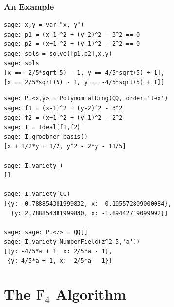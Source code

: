 \documentclass[9pt]{beamer}
\begin{document}
\begin{frame}
\frametitle{An Example}

 
\framebreak

\begin{lstlisting}
sage: x,y = var("x, y")
sage: p1 = (x-1)^2 + (y-2)^2 - 3^2 == 0
sage: p2 = (x+1)^2 + (y-1)^2 - 2^2 == 0
sage: sols = solve([p1,p2],x,y)
sage: sols
[x == -2/5*sqrt(5) - 1, y == 4/5*sqrt(5) + 1], 
[x == 2/5*sqrt(5) - 1, y == -4/5*sqrt(5) + 1]] 
\end{lstlisting}

\framebreak

\begin{lstlisting}
sage: P.<x,y> = PolynomialRing(QQ, order='lex')
sage: f1 = (x-1)^2 + (y-2)^2 - 3^2
sage: f2 = (x+1)^2 + (y-1)^2 - 2^2 
sage: I = Ideal(f1,f2)
sage: I.groebner_basis()
[x + 1/2*y + 1/2, y^2 - 2*y - 11/5]

sage: I.variety()
[]

sage: I.variety(CC)
[{y: -0.788854381999832, x: -0.105572809000084},
  {y: 2.788854381999830, x: -1.89442719099992}]

sage: sage: P.<z> = QQ[]
sage: I.variety(NumberField(z^2-5,'a'))
[{y: -4/5*a + 1, x: 2/5*a - 1}, 
 {y: 4/5*a + 1, x: -2/5*a - 1}]
\end{lstlisting}


\end{frame}


\section{The \texorpdfstring{$\mathrm{F}_4$}{F4} Algorithm}
\end{document}

